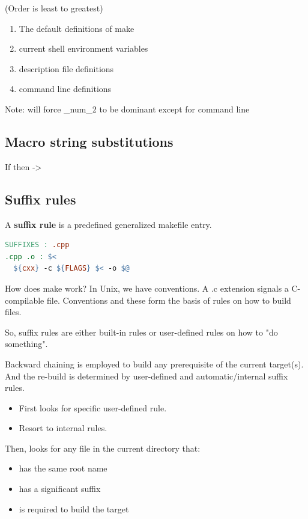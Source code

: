 (Order is least to greatest)

\begin{enumerate}
  \item The default definitions of make
  \item current shell environment variables
  \item description file definitions
  \item command line definitions
\end{enumerate}

Note:  will force \_num_2 to be dominant except for command line

\subsection{Macro string substitutions}

If  then  -> 

\subsection{Suffix rules}

A \textbf{suffix rule} is a predefined generalized makefile entry.

\begin{lstlisting}[language=make]
SUFFIXES : .cpp
.cpp .o : $<
  ${cxx} -c ${FLAGS} $< -o $@
\end{lstlisting}

How does make work? In Unix, we have conventions. A .c extension signals a C-compilable file. Conventions and these form the basis of rules on how to build files. 

So, suffix rules are either built-in rules or user-defined rules on how to "do something".

Backward chaining is employed to build any prerequisite of the current target(s). And the re-build is determined by user-defined and automatic/internal suffix rules.

\begin{itemize}
  \item First looks for specific user-defined rule.
  \item Resort to internal rules.
\end{itemize}

Then,  looks for any file in the current directory that:

\begin{itemize}
  \item has the same root name
  \item has a significant suffix
  \item is required to build the target
\end{itemize}